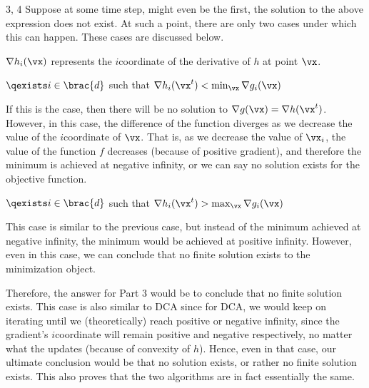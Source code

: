 \documentclass{article}
\begin{document}
\begin{question}
\begin{qpart}{3, 4}
		Suppose at some time step, might even be the first, the solution to the above expression does not exist. At such a point, there are only two cases under which this can happen. These cases are discussed below.

		\begin{note}
			$\nabla h_i(\vx)$ represents the $i$\tth coordinate of the derivative of $h$ at point $\vx$.
		\end{note}

		\begin{enumerate}[label={}]
			\ditem[Case 1] $\qexists i \in \brac{d}$ such that $\nabla h_i(\vx^t) < \min_{\vx} \nabla g_i(\vx)$

				If this is the case, then there will be no solution to $\nabla g(\vx) = \nabla h(\vx^t)$. However, in this case, the difference of the function diverges as we decrease the value of the $i$\tth coordinate of $\vx$. That is, as we decrease the value of $\vx_i$, the value of the function $f$ decreases (because of positive gradient), and therefore the minimum is achieved at negative infinity, or we can say no solution exists for the objective function.

			\ditem[Case 2] $\qexists i \in \brac{d}$ such that $\nabla h_i(\vx^t) > \max_{\vx} \nabla g_i(\vx)$

			This case is similar to the previous case, but instead of the minimum achieved at negative infinity, the minimum would be achieved at positive infinity. However, even in this case, we can conclude that no finite solution exists to the minimization object.
		\end{enumerate}

		Therefore, the answer for Part 3 would be to conclude that no finite solution exists. This case is also similar to DCA since for DCA, we would keep on iterating until we (theoretically) reach positive or negative infinity, since the gradient's $i$\tth coordinate will remain positive and negative respectively, no matter what the updates (because of convexity of $h$). Hence, even in that case, our ultimate conclusion would be that no solution exists, or rather no finite solution exists. This also proves that the two algorithms are in fact essentially the same.

	\end{qpart}

\end{question}
\end{document}
